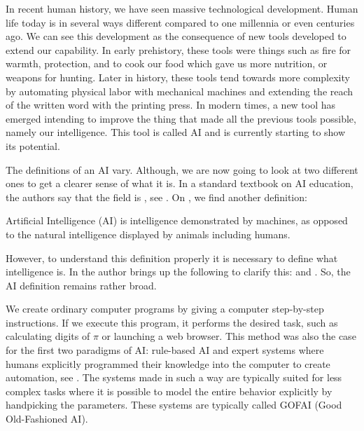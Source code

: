 \documentclass[12pt,A4]{report}
\newcommand{\autobaj}{}
\theoremstyle{definition}
\begin{document}
In recent human history, we have seen massive technological development. Human life today is in several ways different compared to one millennia or even centuries ago. We can see this development as the consequence of new tools developed to extend our capability. In early prehistory, these tools were things such as fire for warmth, protection, and to cook our food which gave us more nutrition, or weapons for hunting. Later in history, these tools tend towards more complexity by automating physical labor with mechanical machines and extending the reach of the written word with the printing press. In modern times, a new tool has emerged intending to improve the thing that made all the previous tools possible, namely our intelligence. This tool is called AI and is currently starting to show its potential. 

The definitions of an AI vary. Although, we are now going to look at two different ones to get a clearer sense of what it is. In a standard textbook on AI education,  the authors say that the field is , see \citet[p.19]{RussellNorvig}. On \citet{Wiki}, we find another definition: 
\begin{displayquote}
Artificial Intelligence (AI) is intelligence demonstrated by machines, as opposed to the natural intelligence displayed by animals including humans.
\end{displayquote}
However, to understand this definition properly it is necessary to define what intelligence is. In \citet[p.22]{TankandeMaskiner} the author brings up the following to clarify this:  and . So, the AI definition remains rather broad.


We create ordinary computer programs by giving a computer step-by-step instructions. If we execute this program, it performs the desired task, such as calculating digits of $\pi$ or launching a web browser. This method was also the case for the first two paradigms of AI: rule-based AI and expert systems where humans explicitly programmed their knowledge into the computer to create automation, see \citet[c.1]{Bostrom14}. The systems made in such a way are typically suited for less complex tasks where it is possible to model the entire behavior explicitly by handpicking the parameters. These systems are typically called GOFAI (Good Old-Fashioned AI). 
\end{document}
